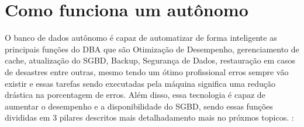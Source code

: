 \section{Como funciona um autônomo}

O banco de dados autônomo é capaz de automatizar de forma inteligente as principais funções do DBA que são Otimização de Desempenho, gerenciamento de cache, atualização do SGBD, Backup, Segurança de Dados, restauração em casos de desastres entre outras, mesmo tendo um ótimo profissional erros sempre vão existir e essas tarefas sendo executadas pela máquina significa uma redução drástica na porcentagem de erros. Além disso, essa tecnologia é capaz de aumentar o desempenho e a disponibilidade do SGBD, sendo essas funções divididas em 3 pilares descritos mais detalhadamento mais no próxmos topicos. \cite{OracleDBAutonomo}:

